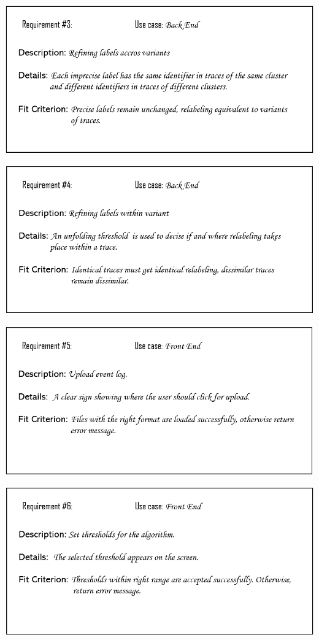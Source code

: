 \documentclass[notitlepage]{article}
\begin{document}
\begin{flushleft}
\includegraphics[scale=0.6]{Req3.png}

\includegraphics[scale=0.6]{Req4.png}

\includegraphics[scale=0.6]{Req5.png}

\includegraphics[scale=0.6]{Req6.png}


\end{flushleft}
\end{document}
